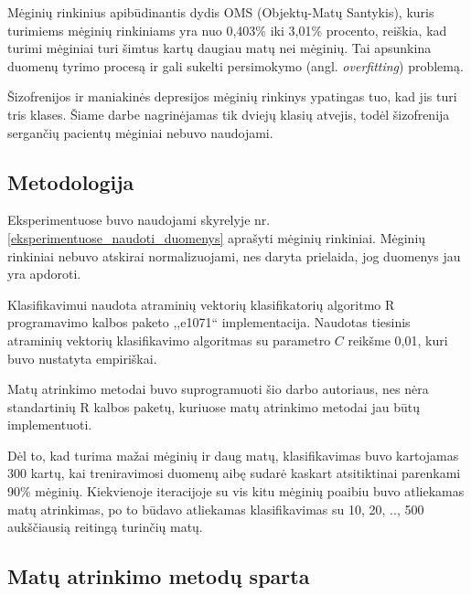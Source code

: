 Mėginių rinkinius apibūdinantis dydis OMS (Objektų-Matų Santykis), kuris turimiems mėginių rinkiniams yra nuo 0,403\% iki 3,01\% procento, reiškia, kad turimi mėginiai turi šimtus kartų daugiau matų nei mėginių. Tai apsunkina duomenų tyrimo procesą ir gali sukelti persimokymo (angl. \textit{overfitting}) problemą.

Šizofrenijos ir maniakinės depresijos mėginių rinkinys ypatingas tuo, kad jis turi tris klases. Šiame darbe nagrinėjamas tik dviejų klasių atvejis, todėl šizofrenija sergančių pacientų mėginiai nebuvo naudojami.

\subsection{Metodologija}

Eksperimentuose buvo naudojami skyrelyje nr. \ref{eksperimentuose_naudoti_duomenys} aprašyti mėginių rinkiniai. Mėginių rinkiniai nebuvo atskirai normalizuojami, nes daryta prielaida, jog duomenys jau yra apdoroti. 

Klasifikavimui naudota atraminių vektorių klasifikatorių algoritmo R programavimo kalbos paketo ,,e1071`` implementacija. Naudotas tiesinis atraminių vektorių klasifikavimo algoritmas su parametro $C$ reikšme 0,01, kuri buvo nustatyta empiriškai.

Matų atrinkimo metodai buvo suprogramuoti šio darbo autoriaus, nes nėra standartinių R kalbos paketų, kuriuose matų atrinkimo metodai jau būtų implementuoti.

Dėl to, kad turima mažai mėginių ir daug matų, klasifikavimas buvo kartojamas 300 kartų, kai treniravimosi duomenų aibę sudarė kaskart atsitiktinai parenkami 90\% mėginių. Kiekvienoje iteracijoje su vis kitu mėginių poaibiu buvo atliekamas matų atrinkimas, po to būdavo atliekamas klasifikavimas su 10, 20, .., 500 aukščiausią reitingą turinčių matų.

\subsection{Matų atrinkimo metodų sparta}

